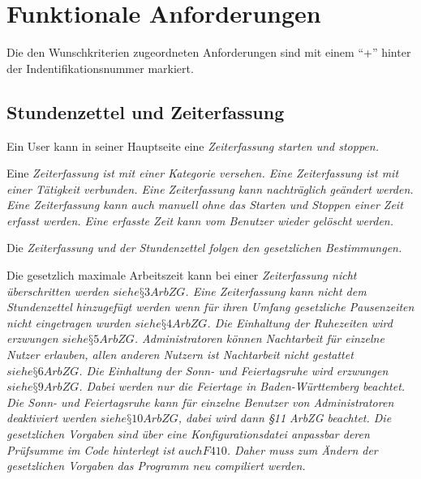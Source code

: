 \section{Funktionale Anforderungen}

Die den Wunschkriterien zugeordneten Anforderungen sind mit einem "`+"' hinter der Indentifikationsnummer markiert.

\subsection{Stundenzettel und Zeiterfassung}

\begin{requirements}
    Ein User kann in seiner Hauptseite eine \em{Zeiterfassung} starten und stoppen.
    \begin{requirements}
         Eine \em{Zeiterfassung} ist mit einer \em{Kategorie} versehen.
         Eine \em{Zeiterfassung} ist mit einer \em{Tätigkeit} verbunden.
         Eine \em{Zeiterfassung} kann nachträglich geändert werden.
         Eine \em{Zeiterfassung} kann auch manuell ohne das Starten und Stoppen einer Zeit erfasst werden.
         Eine erfasste Zeit kann vom \em{Benutzer} wieder gelöscht werden.
    \end{requirements}

    Die \em{Zeiterfassung} und der \em{Stundenzettel} folgen den gesetzlichen Bestimmungen.
    \begin{requirements}
         Die gesetzlich maximale Arbeitszeit kann bei einer \em{Zeiterfassung} nicht überschritten werden \em{\(siehe §3 ArbZG\)}.
         Eine \em{Zeiterfassung} kann nicht dem \em{Stundenzettel} hinzugefügt werden wenn für ihren Umfang gesetzliche Pausenzeiten nicht eingetragen wurden \em{\(siehe §4 ArbZG\)}.
         Die Einhaltung der Ruhezeiten wird erzwungen \em{\(siehe §5 ArbZG\)}.
         \em{Administratoren} können Nachtarbeit für einzelne Nutzer erlauben, allen anderen Nutzern ist Nachtarbeit nicht gestattet \em{\(siehe §6 ArbZG\)}.
         Die Einhaltung der Sonn- und Feiertagsruhe wird erzwungen \em{\(siehe §9 ArbZG\)}.
		Dabei werden nur die Feiertage in Baden-Württemberg beachtet.
                Die Sonn- und Feiertagsruhe kann für einzelne \em{Benutzer} von \em{Administratoren} deaktiviert werden \em{\(siehe §10 ArbZG\)}, dabei wird dann §11 ArbZG beachtet.
         Die gesetzlichen Vorgaben sind über eine Konfigurationsdatei anpassbar deren Prüfsumme im Code hinterlegt ist \em{\(auch F410\)}.
                Daher muss zum Ändern der gesetzlichen Vorgaben das Programm neu compiliert werden.
    \end{requirements}


\end{requirements}
